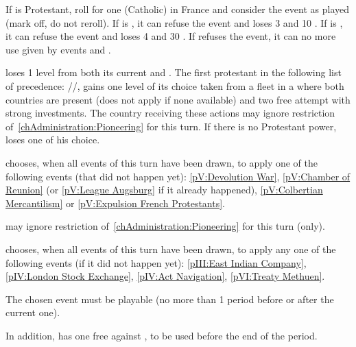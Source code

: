 
\condition{}
\aparag If \FRA is Protestant, roll for one (Catholic) \REVOLT in France and
consider the event as played (mark off, do not reroll).
\aparag If \FRA is \CATHCO, it can refuse the event and loses 3 \STAB and 10
\PV.
\aparag If \FRA is \CATHCR, it can refuse the event and loses 4 \STAB and 30
\PV.
\aparag If \FRA refuses the event, it can no more use \CB given by events
 and .

\phevnt
\aparag \FRA loses 1 level from both its current \FTI and \DTI.
\aparag The first protestant in the following list of precedence:
\HOL/\ENG/\SUE, gains one \TradeFLEET level of its choice taken from a
\TradeFLEET fleet in a \STZ where both countries are present (does not apply
if none available) and two free \COL attempt with strong investments.
\bparag The country receiving these actions may ignore restriction
of~\ref{chAdministration:Pioneering} for this turn.
\bparag If there is no Protestant power, \FRA loses one \TradeFLEET of his
choice.





\phevnt
\aparag \FRA chooses, when all events of this turn have been drawn, to apply
one of the following events (that did not happen yet): \ref{pV:Devolution
  War}, \ref{pV:Chamber of Reunion} (or \ref{pV:League Augsburg} if it already
happened), \ref{pV:Colbertian Mercantilism} or \ref{pV:Expulsion French
  Protestants}.

\phadm
\aparag \FRA may ignore restriction of~\ref{chAdministration:Pioneering} for
this turn (only).




\history{}

\phevnt
\aparag \ENG chooses, when all events of this turn have been drawn, to apply
any one of the following events (if it did not happen yet): \ref{pIII:East
  Indian Company}, \ref{pIV:London Stock Exchange}, \ref{pIV:Act Navigation},
\ref{pVI:Treaty Methuen}.

\bparag The chosen event must be playable (no more than 1 period before or
after the current one).

\aparag In addition, \ENG has one free \OCB against \HOL, to be used before
the end of the period.

